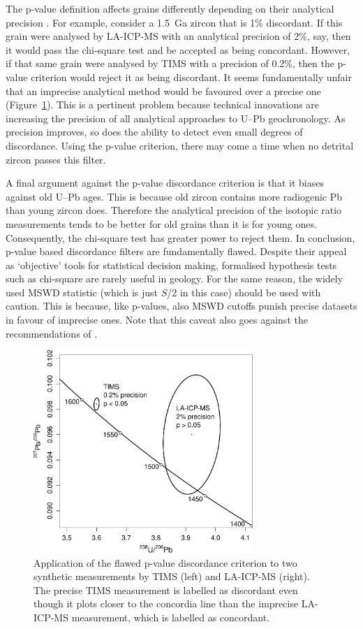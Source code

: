 \documentclass[gchron, manuscript]{copernicus}
\begin{document}
The p-value definition affects grains differently depending on their
analytical precision \citep{nemchin2005}. For example, consider a
1.5~Ga zircon that is 1\% discordant. If this grain were analysed by
LA-ICP-MS with an analytical precision of 2\%, say, then it would pass
the chi-square test and be accepted as being concordant. However, if
that same grain were analysed by TIMS with a precision of 0.2\%, then
the p-value criterion would reject it as being discordant. It seems
fundamentally unfair that an imprecise analytical method would be
favoured over a precise one (Figure~\ref{fig:TIMSvsLAICPMS}). This is
a pertinent problem because technical innovations are increasing the
precision of all analytical approaches to U--Pb geochronology.  As
precision improves, so does the ability to detect even small degrees
of discordance. Using the p-value criterion, there may come a time
when no detrital zircon passes this filter.

A final argument against the p-value discordance criterion is that it
biases against old U--Pb ages. This is because old zircon contains
more radiogenic Pb than young zircon does. Therefore the analytical
precision of the isotopic ratio measurements tends to be better for
old grains than it is for young ones. Consequently, the chi-square
test has greater power \citep[\emph{sensu}][]{cohen1992} to reject
them. In conclusion, p-value based discordance filters are
fundamentally flawed. Despite their appeal as `objective' tools for
statistical decision making, formalised hypothesis tests such as
chi-square are rarely useful in geology. For the same reason, the
widely used MSWD \citep[Mean Square of the Weighted
  Deviates,][]{mcintyre1966} statistic (which is just $S$/2 in this
case) should be used with caution. This is because, like p-values,
also MSWD cutoffs punish precise datasets in favour of imprecise
ones. Note that this caveat also goes against the recommendations of
\citet{spencer2016}.

\begin{figure}
  \includegraphics[width=8.3cm]{TIMSvsICPMS.pdf}
  \caption{Application of the flawed p-value discordance criterion
    to two synthetic measurements by TIMS (left) and LA-ICP-MS
    (right).  The precise TIMS measurement is labelled as discordant
    even though it plots closer to the concordia line than the
    imprecise LA-ICP-MS measurement, which is labelled as
    concordant.
  }
  \label{fig:TIMSvsLAICPMS}
\end{figure}
\end{document}
